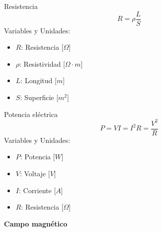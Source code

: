 \documentclass{article}
\begin{document}
\begin{multicols}{3}
\begin{teorema}{Resistencia}
    $$R = \rho \frac{L}{S}$$
    Variables y Unidades:
    \begin{itemize}
        \item $R$: Resistencia [$\Omega$]
        \item $\rho$: Resistividad [$\Omega \cdot m$]
        \item $L$: Longitud [$m$]
        \item $S$: Superficie [$m^2$]
    \end{itemize}
\end{teorema}

\begin{teorema}{Potencia eléctrica}
    $$P = VI = I^2R = \frac{V^2}{R}$$
    Variables y Unidades:
    \begin{itemize}
        \item $P$: Potencia [$W$]
        \item $V$: Voltaje [$V$]
        \item $I$: Corriente [$A$]
        \item $R$: Resistencia [$\Omega$]
    \end{itemize}
\end{teorema}

\end{multicols}

\newpage

\begin{center}
    \LARGE \textbf{Campo magnético}
\end{center}
\end{document}
